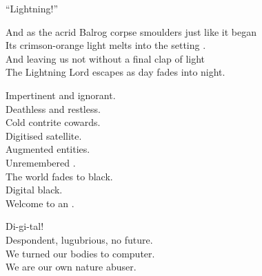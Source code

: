 ``Lightning!'' \\





And as the acrid Balrog corpse smoulders just like it began \\
Its crimson-orange light melts into the setting . \\

And leaving us not without a final clap of light \\
The Lightning Lord escapes as day fades into  night. \\





Impertinent and ignorant. \\
Deathless and restless. \\
Cold contrite cowards. \\

Digitised satellite. \\
Augmented entities. \\
Unremembered . \\

The world fades to black. \\
Digital black. \\

Welcome to an . \\





Di-gi-tal! \\

Despondent, lugubrious, no future. \\
We turned our bodies to computer. \\
We are our own nature abuser. \\

